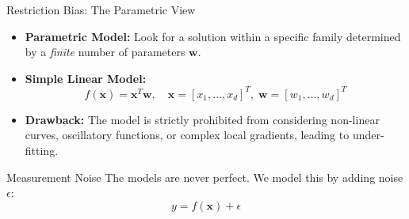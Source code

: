 \documentclass[aspectratio=169, 10pt,handout]{beamer}
\newcommand{\bw}{\mathbf{w}}
\newcommand{\bx}{\mathbf{x}}
\begin{document}
\begin{frame}{Restriction Bias: The Parametric View} 

  \begin{itemize}
    \item \textbf{Parametric Model:} Look for a solution within a specific
      family determined by a \emph{finite} number of parameters $\bw$.
    \item \textbf{Simple Linear Model:}
      \[
        f(\bx) = \bx^T\bw,
        \quad
        \bx=[x_1,\dots,x_d]^T,\;
        \bw=[w_1,\dots,w_d]^T
      \] 
    \item \textbf{Drawback:}  The model is strictly prohibited from considering
      non-linear curves, oscillatory functions, or complex local gradients,
      leading to under-fitting.
  \end{itemize}
  

  \vspace{4pt}
  \begin{block}{Measurement Noise}
    The models  are never perfect.  We model this by adding noise
    $\epsilon$:
    \[
      y = f(\bx) + \epsilon
    \]
  \end{block}

\end{frame}
\end{document}
